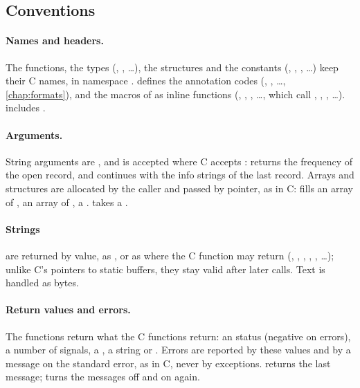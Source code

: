 \subsection{Conventions}

\paragraph{Names and headers.} The functions, the types (,
, \ldots), the structures and the constants (,
, , \ldots) keep their C names, in
namespace .  defines the annotation codes
(, , \ldots, \cref{chap:formats}), and 
the macros of  as inline functions (, ,
, \ldots, which call , ,
, \ldots).  includes .

\paragraph{Arguments.} String arguments are , and  is
accepted where C accepts :  returns the frequency of
the open record, and  continues with the info strings of the last
record. Arrays and structures are allocated by the caller and passed by pointer, as in
C:  fills an array of ,  an array of
,  a .  takes a
.

\paragraph{Strings} are returned by value, as , or as
 where the C function may return 
(, , , , , \ldots);
unlike C's pointers to static buffers, they stay valid after later calls. Text is handled
as bytes.

\paragraph{Return values and errors.} The functions return what the C functions return:
an  status (negative on errors), a number of signals, a , a string
or . Errors are reported by these values and by a message on the
standard error, as in C, never by exceptions.  returns the last message;
 turns the messages off and  on again.

